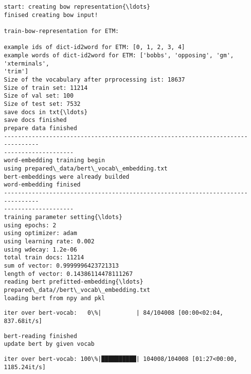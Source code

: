 \documentclass[11pt]{article}
\begin{document}
\begin{Verbatim}[commandchars=\\\{\}]
start: creating bow representation{\ldots}
finised creating bow input!

train-bow-representation for ETM:

example ids of dict-id2word for ETM: [0, 1, 2, 3, 4]
example words of dict-id2word for ETM: ['bobbs', 'opposing', 'gm', 'xterminals',
'trim']
Size of the vocabulary after prprocessing ist: 18637
Size of train set: 11214
Size of val set: 100
Size of test set: 7532
save docs in txt{\ldots}
save docs finished
prepare data finished
--------------------------------------------------------------------------------
--------------------
word-embedding training begin
using prepared\_data/bert\_vocab\_embedding.txt
bert-embeddings were already builded
word-embedding finised
--------------------------------------------------------------------------------
--------------------
training parameter setting{\ldots}
using epochs: 2
using optimizer: adam
using learning rate: 0.002
using wdecay: 1.2e-06
total train docs: 11214
sum of vector: 0.9999996423721313
length of vector: 0.14386114478111267
reading bert prefitted-embedding{\ldots}
prepared\_data//bert\_vocab\_embedding.txt
loading bert from npy and pkl
\end{Verbatim}

    \begin{Verbatim}[commandchars=\\\{\}]
iter over bert-vocab:   0\%|          | 84/104008 [00:00<02:04, 837.68it/s]\end{Verbatim}

    \begin{Verbatim}[commandchars=\\\{\}]
bert-reading finished
update bert by given vocab
\end{Verbatim}

    \begin{Verbatim}[commandchars=\\\{\}]
iter over bert-vocab: 100\%|██████████| 104008/104008 [01:27<00:00, 1185.24it/s]
\end{Verbatim}
\end{document}
